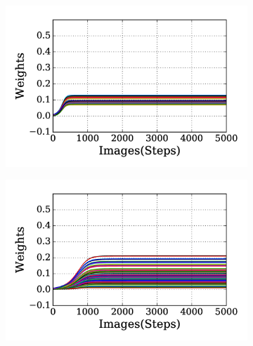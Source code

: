 \subsection{}
\label{subsec:exp_AE}
\begin{figure}
	\centering
	\begin{subfigure}[t]{0.48\textwidth}
		\includegraphics[width=\textwidth]{pics_sdlm/20_exp_AE/exp1_weights_non.png}
		\caption{}
	\end{subfigure}
	\begin{subfigure}[t]{0.48\textwidth}
		\includegraphics[width=\textwidth]{pics_sdlm/20_exp_AE/exp2_weights_non.png}
		\caption{}
	\end{subfigure}
	\begin{subfigure}[t]{0.48\textwidth}

\end{subfigure}
\end{figure}
